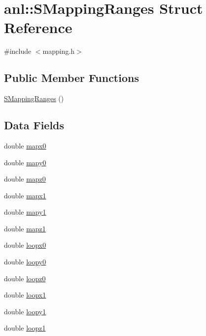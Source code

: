 \hypertarget{structanl_1_1SMappingRanges}{
\section{anl::SMappingRanges Struct Reference}
\label{structanl_1_1SMappingRanges}
}


{\ttfamily \#include $<$mapping.h$>$}\subsection*{Public Member Functions}
\begin{DoxyCompactItemize}
\item 
\hyperlink{structanl_1_1SMappingRanges_aa0a5d875502335622a10f75129ae2450}{SMappingRanges} ()
\end{DoxyCompactItemize}
\subsection*{Data Fields}
\begin{DoxyCompactItemize}
\item 
double \hyperlink{structanl_1_1SMappingRanges_a5a531e092edaa53a04d29c6ca345d0ca}{mapx0}
\item 
double \hyperlink{structanl_1_1SMappingRanges_a96f0ea54a9af58c6c949abb62374f7ad}{mapy0}
\item 
double \hyperlink{structanl_1_1SMappingRanges_a33d5d0568c03b282f90c5b48088cb495}{mapz0}
\item 
double \hyperlink{structanl_1_1SMappingRanges_a83d4c002685f0f29618f910c958782f1}{mapx1}
\item 
double \hyperlink{structanl_1_1SMappingRanges_a28f5e99e246bc97c76a22845d67ca0b7}{mapy1}
\item 
double \hyperlink{structanl_1_1SMappingRanges_a4ebfededc81c8d269f90ccda66e7b876}{mapz1}
\item 
double \hyperlink{structanl_1_1SMappingRanges_a53fb42a31773933f5f7e9bf7b274e325}{loopx0}
\item 
double \hyperlink{structanl_1_1SMappingRanges_ab3ddff981e0cdd1ca4de35f645420516}{loopy0}
\item 
double \hyperlink{structanl_1_1SMappingRanges_adf14e2b9ba538cccf01382ebef7c11bc}{loopz0}
\item 
double \hyperlink{structanl_1_1SMappingRanges_a2666d309efec62da25c2699a42f9247f}{loopx1}
\item 
double \hyperlink{structanl_1_1SMappingRanges_a2afb0ceff1c21c2e8fb1e255d23d98f5}{loopy1}
\item 
double \hyperlink{structanl_1_1SMappingRanges_a45bb476f83ea6195b49bf60281466450}{loopz1}
\end{DoxyCompactItemize}


